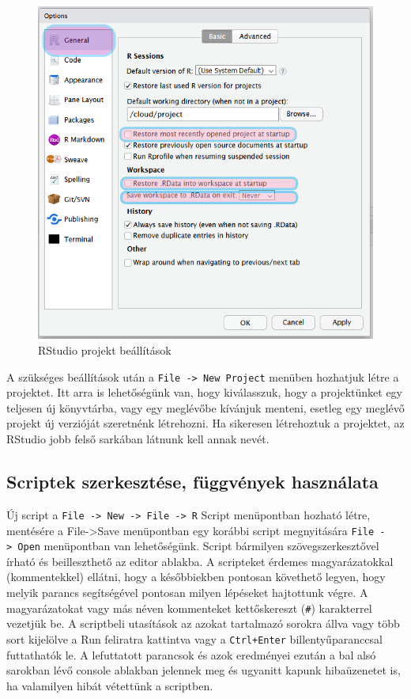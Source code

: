 \documentclass[
]{book}
\begin{document}
\begin{figure}

{\centering \includegraphics[width=0.9\linewidth]{figures/13-02_project_options} 

}

\caption{RStudio projekt beállítások}\label{fig:unnamed-chunk-45}
\end{figure}

A szükséges beállítások után a
\texttt{File\ -\textgreater{}\ New\ Project} menüben hozhatjuk létre a
projektet. Itt arra is lehetőségünk van, hogy kiválasszuk, hogy a
projektünket egy teljesen új könyvtárba, vagy egy meglévőbe kívánjuk
menteni, esetleg egy meglévő projekt új verzióját szeretnénk létrehozni.
Ha sikeresen létrehoztuk a projektet, az RStudio jobb felső sarkában
látnunk kell annak nevét.

\hypertarget{scriptek-szerkesztuxe9se-fuxfcggvuxe9nyek-hasznuxe1lata}{%
\subsection{Scriptek szerkesztése, függvények
használata}\label{scriptek-szerkesztuxe9se-fuxfcggvuxe9nyek-hasznuxe1lata}}

Új script a
\texttt{File\ -\textgreater{}\ New\ -\textgreater{}\ File\ -\textgreater{}\ R}
Script menüpontban hozható létre, mentésére a File-\textgreater Save
menüpontban egy korábbi script megnyitására
\texttt{File\ -\textgreater{}\ Open} menüpontban van lehetőségünk.
Script bármilyen szövegszerkesztővel írható és beilleszthető az editor
ablakba. A scripteket érdemes magyarázatokkal (kommentekkel) ellátni,
hogy a későbbiekben pontosan követhető legyen, hogy melyik parancs
segítségével pontosan milyen lépéseket hajtottunk végre. A
magyarázatokat vagy más néven kommenteket kettőskereszt (\texttt{\#})
karakterrel vezetjük be. A scriptbeli utasítások az azokat tartalmazó
sorokra állva vagy több sort kijelölve a Run feliratra kattintva vagy a
\texttt{Ctrl+Enter} billentyűparanccsal futtathatók le. A lefuttatott
parancsok és azok eredményei ezután a bal alsó sarokban lévő console
ablakban jelennek meg és ugyanitt kapunk hibaüzenetet is, ha valamilyen
hibát vétettünk a scriptben.
\end{document}
